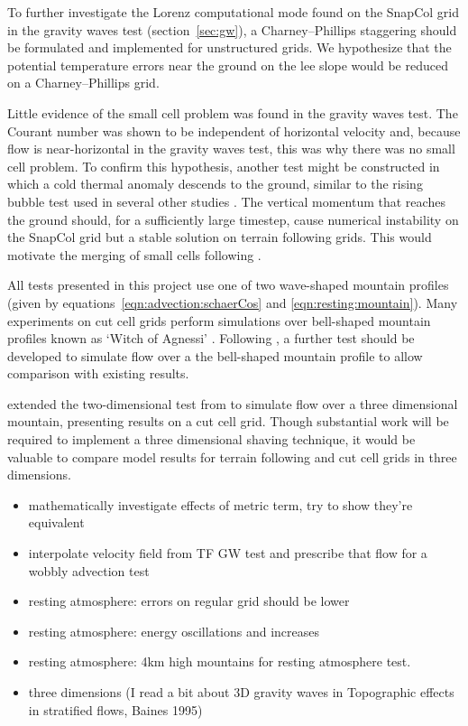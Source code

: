 
To further investigate the Lorenz computational mode found on the SnapCol grid in the gravity waves test (section~\ref{sec:gw}), a Charney--Phillips staggering should be formulated and implemented for unstructured grids.  We hypothesize that the potential temperature errors near the ground on the lee slope would be reduced on a Charney--Phillips grid.


Little evidence of the small cell problem was found in the gravity waves test.  The Courant number was shown to be independent of horizontal velocity and, because flow is near-horizontal in the gravity waves test, this was why there was no small cell problem.  To confirm this hypothesis, another test might be constructed in which a cold thermal anomaly descends to the ground, similar to the rising bubble test used in several other studies \parencites{bonaventura2000}{jebens2011}{good2013}.  The vertical momentum that reaches the ground should, for a sufficiently large timestep, cause numerical instability on the SnapCol grid but a stable solution on terrain following grids.  This would motivate the merging of small cells following \textcite{yamazaki-satomura2010}.


All tests presented in this project use one of two wave-shaped mountain profiles (given by equations~\ref{eqn:advection:schaerCos} and \ref{eqn:resting:mountain}).  Many experiments on cut cell grids perform simulations over bell-shaped mountain profiles known as `Witch of Agnessi' \parencites{steppeler2002}{rosatti2005}{jebens2011}.  Following \textcite{gallus-klemp2000}, a further test should be developed to simulate flow over a the bell-shaped mountain profile to allow comparison with existing results.

\textcite{lock2012} extended the two-dimensional test from \textcite{gallus-klemp2000} to simulate flow over a three dimensional mountain, presenting results on a cut cell grid.  Though substantial work will be required to implement a three dimensional shaving technique, it would be valuable to compare model results for terrain following and cut cell grids in three dimensions.

\begin{itemize}
\item mathematically investigate effects of metric term, try to show they're equivalent
\item interpolate velocity field from TF GW test and prescribe that flow for a wobbly advection test
\item resting atmosphere: errors on regular grid should be lower
\item resting atmosphere: energy oscillations and increases
\item resting atmosphere: 4km high mountains for resting atmosphere test.
\item three dimensions (I read a bit about 3D gravity waves in Topographic effects in stratified flows, Baines 1995) 
\end{itemize}
